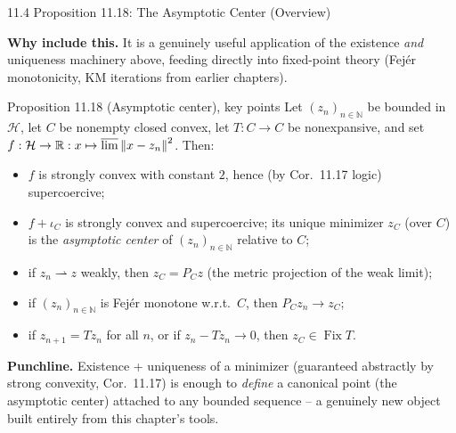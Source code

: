 \documentclass[aspectratio=169,10pt]{beamer}
\newcommand{\mHH}{\mathcal H}
\newcommand{\norm}[1]{\left\|#1\right\|}
\newcommand{\R}{\mathbb{R}}
\newcommand{\iC}{\iota_C}
\begin{document}
\begin{frame}{11.4 Proposition 11.18: The Asymptotic Center (Overview)}

  \textbf{Why include this.} It is a genuinely useful application of
  the existence \emph{and} uniqueness machinery above, feeding
  directly into fixed-point theory (Fej\'er monotonicity, KM
  iterations from earlier chapters).

  \begin{block}{Proposition 11.18 (Asymptotic center), key points}
    Let $(z_n)_{n\in\mathbb N}$ be bounded in $\mHH$, let $C$ be
    nonempty closed convex, let $T:C\to C$ be nonexpansive, and set
    $f:\mHH\to\R:x\mapsto\varlimsup\norm{x-z_n}^2$. Then:
    \begin{itemize}
      \item $f$ is strongly convex with constant $2$, hence (by
            Cor.\ 11.17 logic) supercoercive;
      \item $f+\iC$ is strongly convex and supercoercive; its unique
            minimizer $z_C$ (over $C$) is the \emph{asymptotic center}
            of $(z_n)_{n\in\mathbb N}$ relative to $C$;
      \item if $z_n\rightharpoonup z$ weakly, then $z_C=P_Cz$ (the
            metric projection of the weak limit);
      \item if $(z_n)_{n\in\mathbb N}$ is Fej\'er monotone w.r.t.\
            $C$, then $P_Cz_n\to z_C$;
      \item if $z_{n+1}=Tz_n$ for all $n$, or if $z_n-Tz_n\to0$, then
            $z_C\in\operatorname{Fix}T$.
    \end{itemize}
  \end{block}

  \textbf{Punchline.} Existence + uniqueness of a minimizer
  (guaranteed abstractly by strong convexity, Cor.\ 11.17) is enough
  to \emph{define} a canonical point (the asymptotic center)
  attached to any bounded sequence -- a genuinely new object built
  entirely from this chapter's tools.

\end{frame}
\end{document}
